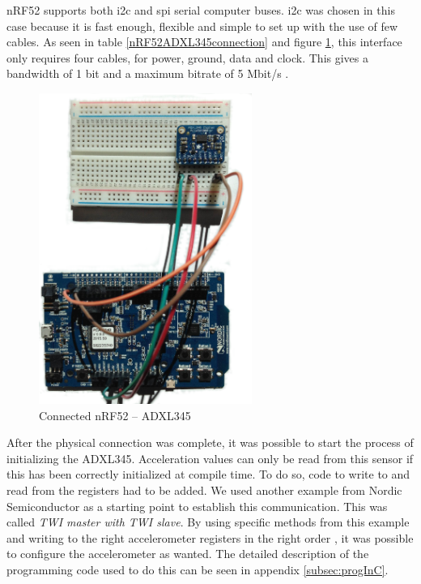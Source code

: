 \noindent \gls{nRF52} supports both \gls{i2c} and \gls{spi} serial computer buses. \gls{i2c} was chosen in this case because it is fast enough, flexible and simple to set up with the use of few cables. As seen in table \ref{nRF52ADXL345connection} and figure \ref{fig:nrf-adxl345}, this interface only requires four cables, for power, ground, data and clock. This gives a bandwidth of 1 bit and a maximum bitrate of 5 Mbit/s \cite{semiconductors2000i2c}. 

\begin{figure}[ht]
    \centering
    \includegraphics[width=0.62\textwidth]{connectionADXL-nrf5.png}    
    \caption{Connected nRF52 -- ADXL345}
    \label{fig:nrf-adxl345}
\end{figure}

\newpage


\noindent After the physical connection was complete, it was possible to start the process of initializing the \gls{ADXL345}. Acceleration values can only be read from this sensor if this has been correctly initialized at compile time. To do so, code to write to and read from the registers had to be added. We used another example from Nordic Semiconductor as a starting point to establish this communication. This was called \textit{TWI master with TWI slave}. By using specific methods from this example and writing to the right accelerometer registers in the right order \cite{devices2009digital}, it was possible to configure the accelerometer as wanted. The detailed description of the programming code used to do this can be seen in appendix \ref{subsec:progInC}. 

